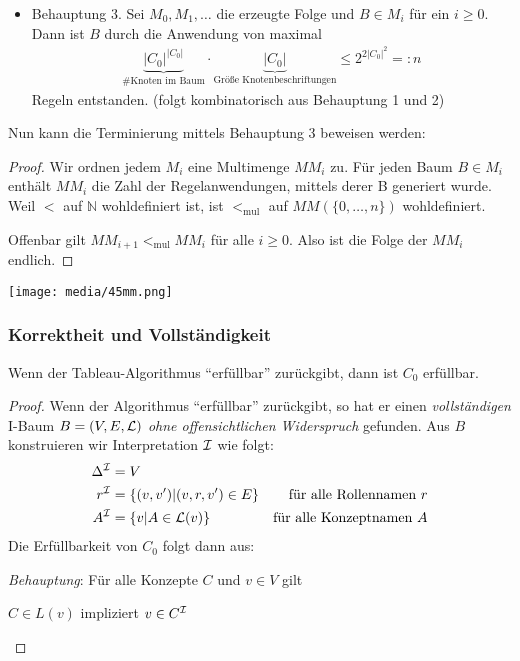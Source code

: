 \begin{itemize}
\item Behauptung 3.
  Sei $M_{0},M_1,\ldots$ die erzeugte Folge und $B \in M_i$ für
  ein $i \geq 0$. Dann ist $B$ durch die Anwendung von maximal
  \begin{align*}
      \underbrace{\left| C_{0} \right|^{\left| C_{0} \right|}}_\text{\# Knoten im Baum} \cdot \underbrace{\left| C_{0} \right|}_\text{Größe Knotenbeschriftungen} \leq 2^{2\left| C_{0} \right|^{2}} =: n
  \end{align*}
  Regeln entstanden. (folgt kombinatorisch aus Behauptung 1 und 2)

\end{itemize}

Nun kann die Terminierung mittels Behauptung 3 beweisen werden:

\begin{tafel}

\begin{proof}
    Wir ordnen jedem $M_i$ eine Multimenge $MM_i$ zu. Für jeden Baum $B \in
    M_i$ enthält $MM_i$ die Zahl der Regelanwendungen, mittels derer B
    generiert wurde.
    Weil $<$ auf $\mathbb{N}$ wohldefiniert ist, ist $<_{\text{mul}}$ auf $MM(\{0,\ldots,n\})$ wohldefiniert.

    Offenbar gilt $MM_{i+1} <_{\text{mul}} MM_i$ für alle $i \geq 0$. Also ist die Folge der $MM_i$ endlich.
\end{proof}

\texttt{[image: media/45mm.png]}
\end{tafel}

\subsubsection{Korrektheit und Vollständigkeit}

\begin{theorem}\label{thm-korrektheit1}
    Wenn der Tableau-Algorithmus \enquote{erfüllbar} zurückgibt, dann ist $C_{0}$
erfüllbar.
\end{theorem}

\begin{proof}
    Wenn der Algorithmus \enquote{erfüllbar} zurückgibt, so hat er einen
    \emph{vollständigen} I-Baum $B = (V, E, \mathcal{L})$ \emph{ohne offensichtlichen
    Widerspruch} gefunden. Aus $B$ konstruieren wir Interpretation $\mathcal{I}$ wie
    folgt:
    \begin{align*}
        \Delta^\MI &= V\\
        r^\MI &= \left\{(v, v') \middle| (v, r, v') \in E\right\} & \text{für alle Rollennamen $r$}\\
        A^\MI &= \left\{v \middle| A \in \ML(v)\right\} & \text{für alle Konzeptnamen $A$}
    \end{align*}
    Die Erfüllbarkeit von $C_0$ folgt dann aus:

    \emph{Behauptung}: Für alle Konzepte $C$ und $v \in V$ gilt

    \begin{center}$C \in L\left( v \right)$ impliziert $v \in C^{\mathcal{I}}$\end{center}
\end{proof}

